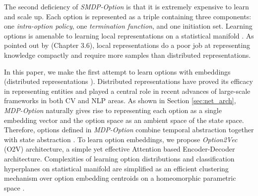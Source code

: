\documentclass[10pt,journal,compsoc]{IEEEtran}
\newcommand{\red}[1]{\textcolor[HTML]{EB4335}{#1}}
\newcommand{\blue}[1]{\textcolor[HTML]{4285F4}{#1}}
\renewcommand{\citename}{\citet}
\renewcommand{\cite}{\citep}
\begin{document}
The second deficiency of \emph{SMDP-Option} is that it is
extremely expensive to learn and scale up. Each option is
represented as a triple containing three components: one
\emph{intra-option policy}, one \emph{termination function}, and
one initiation set. Learning options is amenable to learning
local representations \cite{bacon2018temporal} on a statistical
manifold \cite{amari1987differential}. As pointed out by
\citename{bacon2018temporal} (Chapter 3.6), local representations
do a poor job at representing knowledge compactly and require
more samples than distributed representations.

In this paper, we make the first attempt to learn options with
embeddings (distributed representations
\cite{hinton1986learning}). Distributed representations have
proved its efficacy in representing entities and played a central
role in recent advances of large-scale frameworks in both CV
\cite{krizhevsky2012imagenet,dosovitskiy2020image} and NLP
\cite{vaswani2017attention,devlin2018bert,brown2020language}
areas. As shown in Section \ref{sec:net_arch}, \emph{MDP-Option}
naturally gives rise to representing each option as a single
embedding vector and the option space as an ambient space of the
state space. Therefore, options defined in \emph{MDP-Option}
combine temporal abstraction together with state abstraction
\cite{knoblock1990learning}. To learn option embeddings, we
propose \emph{Option2Vec} (O2V) architecture, a simple yet
effective Attention \cite{vaswani2017attention} based
Encoder-Decoder architecture. Complexities of learning option
distributions and classification hyperplanes on statistical
manifold are simplified as an efficient clustering mechanism over
option embedding centroids on a homeomorphic parametric space
\cite{amari1987differential}.
\end{document}
